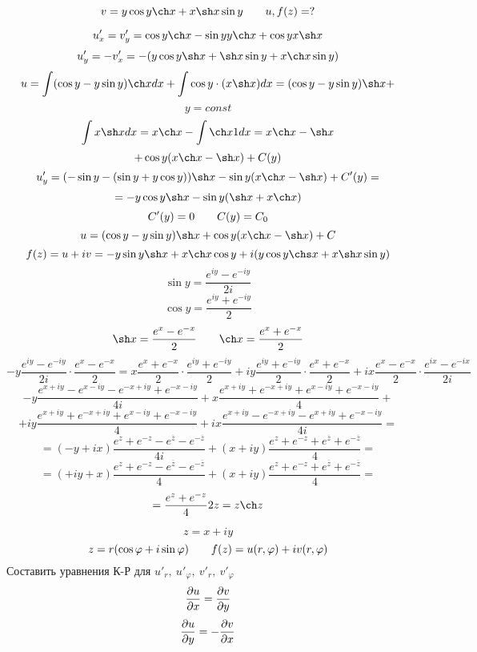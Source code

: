\documentclass[main]{subfiles}
\begin{document}
\begin{lect}
   \begin{Task}[2]
       \[v = y\cos y \ch x + x\sh x \sin y \qq u, f(z) = ?\]

       \[u'_x = v'_y = \cos y \ch x - \sin y y \ch x + \cos y x \sh x\]
       \[u'_y = -v'_x = -(y\cos y \sh x + \sh x \sin y + x\ch x \sin y)\]
       \[u = \int (\cos y - y\sin y) \ch x dx + \int \cos y \cdot (x\sh x)dx = (\cos y - y\sin y)\sh x + \]
       \[y = const\]
       \[\int x\sh x dx = x\ch x - \int \ch x 1 dx = x\ch x - \sh x\]
       \[+ \cos y(x\ch x - \sh x) + C(y)\]
       \[u'_y = (-\sin y -(\sin y + y\cos y)) \sh x - \sin y (x\ch x - \sh x) + C'(y) = \]
       \[= -y\cos y \sh x -\sin y (\sh x + x\ch x)\]
       \[C'(y) = 0 \qquad C(y) = C_0\]
       \[u = (\cos y - y\sin y)\sh x  + \cos y (x\ch x - \sh x) + C\]
       \[f(z) = u + iv = -y\sin y \sh x + x\ch x \cos y + 
       i(y\cos y \chs x + x\sh x \sin y)\]
       \[\sin y = \frac{e^{iy} - e^{-iy}  }{2i}\]
       \[\cos y = \frac{e^{iy} + e^{-iy}  }{2}\]
       \[\sh x = \frac{e^{x} - e^{-x}  }{2} \qq \ch x = \frac{e^x + e^{-x} }{2}\]
       \[-y \frac{e^{iy} - e^{-iy}  }{2i} \cdot \frac{e^x - e^{-x} }{2 } = x \frac{e^x + e^{-x}}{2} 
       \cdot \frac{e^{iy} + e^{-iy}  }{2} + iy \frac{e^{iy} + e^{-iy} }{2} \cdot 
        \frac{e^x + e^{-x} }{2} + ix \frac{e^x - e^{-x} }{2} \cdot \frac{e^{ix} - e^{-ix}  }{2i}\]
        \[-y \frac{e^{x + iy} - e^{x - iy}  - e^{-x + iy} + e^{-x -iy}   }{4i} + 
        x\frac{e^{x + iy} + e^{-x + iy} + e^{x - iy} + e^{-x - iy}    }{4} + \]
        \[+ iy \frac{e^{x + iy} + e^{-x + iy} + e^{x - iy} + e^{-x - iy}   }{4} + 
        ix \frac{e^{x + iy} - e^{-x + iy} - e^{x + iy} + e^{-x - iy}    }{4i} = \]
        \[= (-y + ix) \frac{e^z + e^{-z} - e^{\overline{z}} - e^{-\overline{z}}   }{4i} + 
        (x + iy) \frac{e^z  +e^{-z} + e^{\overline{z}} + e^{-\overline{z}}   }{4} = \]
        \[= (+iy + x) \frac{e^z + e^{-z} - e^{\overline{z}} - e^{-\overline{z}}   }{4} + 
         (x + iy) \frac{e^z  +e^{-z} + e^{\overline{z}} + e^{-\overline{z}}   }{4} =\]
         \[= \frac{e^z + e^{-z} }{4} 2z = z \ch z\]
   \end{Task}

   \begin{Task}[3]
       \[z = x + iy\]
       \[z = r(\cos \varphi + i\sin \varphi) \qquad f(z) = u(r, \varphi) + iv(r, \varphi)\]
       Составить уравнения К-Р для $u'_r, \ u'_\varphi, \ v'_r, \ v'_\varphi$
       \[\frac{\partial u}{\partial x} = \frac{\partial v}{\partial y}\]
       \[\frac{\partial u}{\partial y} = -\frac{\partial v}{\partial x}\]


\end{Task}
\end{lect}
\end{document}
